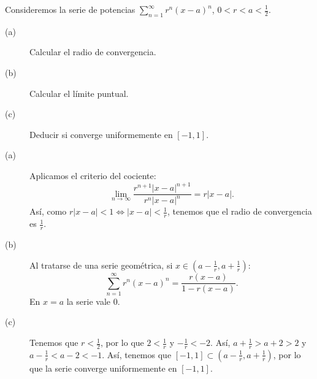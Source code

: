 \documentclass{article}
\begin{document}
\begin{ej}
Consideremos la serie de potencias $\displaystyle \sum^{\infty}_{n = 1}r^{n}\left(x-a\right)^{n} $, $\displaystyle 0 < r < a < \frac{1}{2} $.
\begin{description}
\item[(a)] Calcular el radio de convergencia.
\item[(b)] Calcular el límite puntual.
\item[(c)] Deducir si converge uniformemente en $\displaystyle \left[-1,1\right]  $.
\end{description}
\end{ej}
\begin{sol}
\begin{description}
\item[(a)] Aplicamos el criterio del cociente:
	\[\lim_{n \to \infty}\frac{r^{n+1} \left|x-a\right|^{n+1}}{r^{n} \left|x-a\right|^{n}} = r \left|x-a\right| .\]
	Así, como $\displaystyle r \left|x-a\right| < 1 \iff \left|x-a\right| < \frac{1}{r} $, tenemos que el radio de convergencia es $\displaystyle \frac{1}{r} $.
\item[(b)] Al tratarse de una serie geométrica, si $\displaystyle x \in \left(a - \frac{1}{r}, a + \frac{1}{r}\right) $:
	\[\sum^{\infty}_{n = 1}r^{n}\left(x-a\right)^{n} = \frac{r\left(x-a\right)}{1 - r\left(x-a\right)} .\]
En $\displaystyle x = a $ la serie vale 0.
\item[(c)] Tenemos que $\displaystyle r < \frac{1}{2} $, por lo que $\displaystyle 2 < \frac{1}{r} $ y $\displaystyle -\frac{1}{r} < - 2 $. Así, $\displaystyle a + \frac{1}{r} > a + 2 > 2 $ y $\displaystyle a - \frac{1}{r} < a - 2 < -1 $. Así, tenemos que $\displaystyle \left[-1,1\right] \subset \left(a-\frac{1}{r}, a +\frac{1}{r}\right) $, por lo que la serie converge uniformemente en $\displaystyle \left[-1,1\right]  $.
\end{description}

\end{sol}
 
\end{document}
